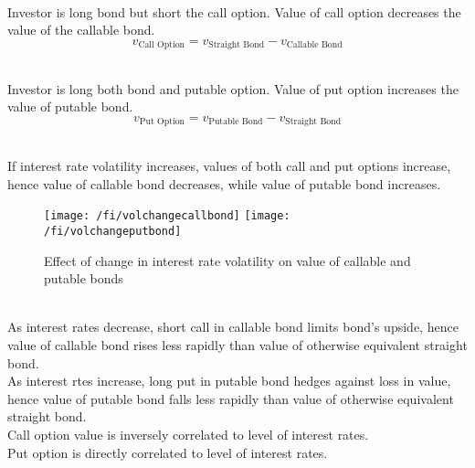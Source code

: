 \begin{remark} \\
Investor is long bond but short the call option. Value of call option decreases the value of the callable bond.
\begin{equation}
v_{\text{Call Option}} = v_{\text{Straight Bond}} - v_{\text{Callable Bond}} \nonumber
\end{equation}
\end{remark}

\begin{remark} \\
Investor is long both bond and putable option. Value of put option increases the value of putable bond.
\begin{equation}
v_{\text{Put Option}} = v_{\text{Putable Bond}} - v_{\text{Straight Bond}} \nonumber
\end{equation}
\end{remark}

\begin{remark} \\
If interest rate volatility increases, values of both call and put options increase, hence value of callable bond decreases, while value of putable bond increases.
\end{remark}

\begin{figure}[H]
\centering
\texttt{[image: /fi/volchangecallbond]}
\texttt{[image: /fi/volchangeputbond]}
\caption{Effect of change in interest rate volatility on value of callable and putable bonds}
\end{figure}

\begin{remark} \\
As interest rates decrease, short call in callable bond limits bond's upside, hence value of callable bond rises less rapidly than value of otherwise equivalent straight bond.\\
As interest rtes increase, long put in putable bond hedges against loss in value, hence value of putable bond falls less rapidly than value of otherwise equivalent straight bond.\\
Call option value is inversely correlated to level of interest rates.\\
Put option is directly correlated to level of interest rates.
\end{remark}

